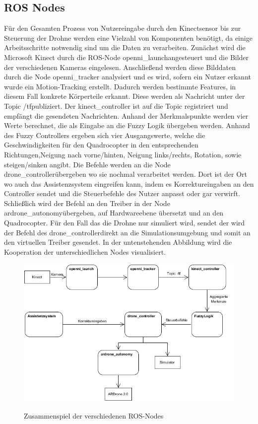 \subsection{ROS Nodes}
Für den Gesamten Prozess von Nutzereingabe durch den Kinectsensor bis zur Steuerung der Drohne werden eine Vielzahl von Komponenten benötigt, da einige Arbeitsschritte notwendig sind um die Daten zu verarbeiten. Zunächst wird die Microsoft Kinect durch die ROS-Node \grqq openni\_launch\grqq angesteuert und die Bilder der verschiedenen Kameras eingelesen. Anschließend werden diese Bilddaten durch die Node \grqq openni\_tracker \grqq analysiert und es wird, sofern ein Nutzer erkannt wurde ein Motion-Tracking erstellt. Dadurch werden bestimmte Features, in diesem Fall konkrete Körperteile erkannt. Diese werden als Nachricht unter der Topic \grqq/tf\grqq \space publiziert. Der kinect\_controller ist auf die Topic registriert und empfängt die gesendeten Nachrichten. Anhand der Merkmalspunkte werden vier Werte berechnet, die als Eingabe an die Fuzzy Logik übergeben werden. Anhand des Fuzzy Controllers ergeben sich vier Ausgangswerte, welche die Geschwindigkeiten für den Quadrocopter in den entsprechenden Richtungen,Neigung nach vorne/hinten, Neigung links/rechts, Rotation, sowie steigen/sinken angibt. Die Befehle werden an die Node 
\grqq drone\_controller\grqq übergeben wo sie nochmal verarbeitet werden. Dort ist der Ort wo auch das Assistenzsystem eingreifen kann, indem es Korrektureingaben an den Controller sendet und die Steuerbefehle des Nutzer anpasst oder gar verwirft. Schließlich wird der Befehl an den Treiber in der Node \grqq ardrone\_autonomy\grqq \space übergeben, auf Hardwareebene übersetzt und an den Quadrocopter. Für den Fall das die Drohne nur simuliert wird, sendet der wird der Befehl des \grqq drone\_controller\grqq direkt an die Simulationsumgebung und somit an den virtuellen Treiber gesendet. In der untenstehenden Abbildung wird die Kooperation der unterschiedlichen Nodes visualisiert. 
\begin{figure}[ht]
	\centering
	\includegraphics[scale=0.7]{Bilder/ros_nodes_flow.jpg}
	\label{Zusammenspiel der verschiedenen ROS-Nodes}
	\caption{Zusammenspiel der verschiedenen ROS-Nodes}
\end{figure}
\newpage


